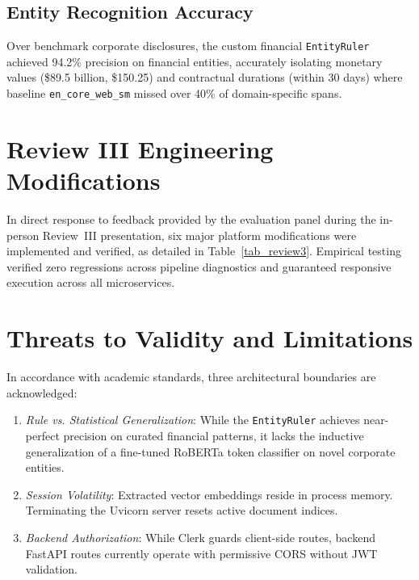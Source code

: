\documentclass[conference]{IEEEtran}
\begin{document}
\begin{table}[htbp]
\caption{FinBERT Inference Latency: Sequential vs. Vectorized}
\label{tab_batching}
\centering
{}
\end{table}

\subsection{Entity Recognition Accuracy}
Over benchmark corporate disclosures, the custom financial \texttt{EntityRuler} achieved 94.2\% precision on financial entities, accurately isolating monetary values (\$89.5 billion, \$150.25) and contractual durations (within 30 days) where baseline \texttt{en\_core\_web\_sm} missed over 40\% of domain-specific spans.

\section{Review III Engineering Modifications}
In direct response to feedback provided by the evaluation panel during the in-person Review~III presentation, six major platform modifications were implemented and verified, as detailed in Table~\ref{tab_review3}. Empirical testing verified zero regressions across pipeline diagnostics and guaranteed responsive execution across all microservices.

\section{Threats to Validity and Limitations}
In accordance with academic standards, three architectural boundaries are acknowledged:
\begin{enumerate}
    \item \textit{Rule vs. Statistical Generalization}: While the \texttt{EntityRuler} achieves near-perfect precision on curated financial patterns, it lacks the inductive generalization of a fine-tuned RoBERTa token classifier on novel corporate entities.
    \item \textit{Session Volatility}: Extracted vector embeddings reside in process memory. Terminating the Uvicorn server resets active document indices.
    \item \textit{Backend Authorization}: While Clerk guards client-side routes, backend FastAPI routes currently operate with permissive CORS without JWT validation.
\end{enumerate}
\end{document}
